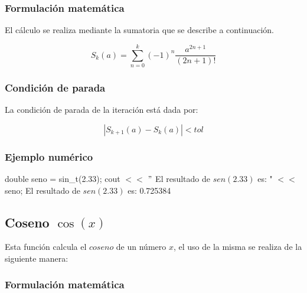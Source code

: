\documentclass[10pt,a4paper]{article}
\begin{document}
	\begin{center}
	\end{center}
	
	\subsubsection{Formulación matemática}
	
	El cálculo se realiza mediante la sumatoria que se describe a continuación.
	
	\begin{equation}\label{key6}
		S_{k}(a) = \sum_{n=0}^{k}(-1)^{n}\frac{a^{2n + 1}}{(2n + 1)!}
	\end{equation}
	
	\subsubsection{Condición de parada}
	
	La condición de parada de la iteración está dada por: 
	
	\begin{equation}\label{key7}
		\left\lvert S_{k+1}(a) - S_{k}(a) \right\lvert < tol
	\end{equation}
	
	
	\subsubsection{Ejemplo numérico}
	
	double seno = sin{\_}t(2.33); \newline
	cout $<<$ $"$ El resultado de $sen(2.33)$ es: " $<<$ seno; \newline
	El resultado de $sen(2.33)$ es: 0.725384\newline

	\subsection{Coseno $\cos(x)$}
	
	Esta función calcula el $coseno$ de un número $x$, el uso de la misma se realiza de la siguiente manera:
	
		\begin{center}
	\end{center}
	
	\subsubsection{Formulación matemática}
	
\end{document}
